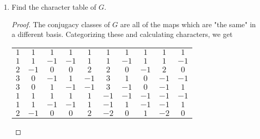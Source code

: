 \documentclass[../psets.tex]{subfiles}
\begin{document}
\begin{enumerate}
\begin{enumerate}
\begin{equation*}
            (x_1,x_2,x_3) \mapsto (\pm x_{\sigma(1)},\pm x_{\sigma(2)},\pm x_{\sigma(3)})
        \end{equation*}
        for $\sigma\in S_3$.
        \begin{proof}
            Let $x_1,x_2,x_3$ represent vectors pointing to three faces of the cube that surround one vertex. $x_1\mapsto\pm x_{\sigma(1)}$ sends $x_1$ to any of the six faces of the cube. Once that is set, $x_2\mapsto\pm x_{\sigma(2)}$ sends $x_2$ to any of the four faces \emph{not in the span of} $x_{\sigma(1)}$ since $\sigma$ is a bijection and thus cannot map 2 to the same place it maps 1. Note that the four faces available to the image of $x_2$ are all adjacent to $\spn(\im(x_1))$! Finally, $x_3\mapsto\pm x_{\sigma(3)}$ sends $x_3$ to any of the two faces not in $\spn(\im(x_1,x_2))$; these are likewise adjacent to the faces of 1 and 2. Altogether, we get $6\cdot 4\cdot 2=48$ possible maps, once again, so every map is accounted for and there are no duplicates.
        \end{proof}
        \item Find the character table of $G$.
        \begin{proof}
            The conjugacy classes of $G$ are all of the maps which are "the same" in a different basis. Categorizing these and calculating characters, we get
            \begin{center}
                \renewcommand{\arraystretch}{1.2}
                \begin{tabular}{cccccccccc}
                    $1$ & $1$  & $1$  & $1$  & $1$  & $1$  & $1$  & $1$  & $1$  & $1$\\
                    $1$ & $1$  & $-1$ & $-1$ & $1$  & $1$  & $-1$ & $1$  & $1$  & $-1$\\
                    $2$ & $-1$ & $0$  & $0$  & $2$  & $2$  & $0$  & $-1$ & $2$  & $0$\\
                    $3$ & $0$  & $-1$ & $1$  & $-1$ & $3$  & $1$  & $0$  & $-1$ & $-1$\\
                    $3$ & $0$  & $1$  & $-1$ & $-1$ & $3$  & $-1$ & $0$  & $-1$ & $1$\\
                    $1$ & $1$  & $1$  & $1$  & $1$  & $-1$ & $-1$ & $-1$ & $-1$ & $-1$\\
                    $1$ & $1$  & $-1$ & $-1$ & $1$  & $-1$ & $1$  & $-1$ & $-1$ & $1$\\
                    $2$ & $-1$ & $0$  & $0$  & $2$  & $-2$ & $0$  & $1$  & $-2$ & $0$\\

\end{tabular}
\end{center}
\end{proof}
\end{enumerate}
\end{enumerate}
\end{document}
